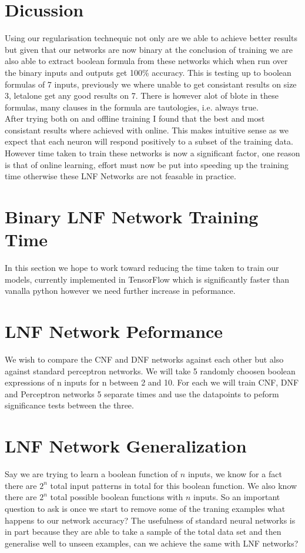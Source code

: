 \documentclass{article}
\theoremstyle{definition}
\begin{document}
\section{Dicussion}
Using our regularisation technequic not only are we able to achieve better results but given that our networks are now binary at the conclusion of training we are also able to extract boolean formula from these networks which when run over the binary inputs and outputs get 100\% accuracy. This is testing up to boolean formulas of 7 inputs, previously we where unable to get consistant results on size 3, letalone get any good results on 7. There is however alot of blote in these formulas, many clauses in the formula are tautologies, i.e. always true. \\

After trying both on and offline training I found that the best and most consistant results where achieved with online. This makes intuitive sense as we expect that each neuron will respond positively to a subset of the training data.\\

However time taken to train these networks is now a significant factor, one reason is that of online learning, effort must now be put into speeding up the training time otherwise these LNF Networks are not feasable in practice.

\section{Binary LNF Network Training Time}
In this section we hope to work toward reducing the time taken to train our models, currently implemented in TensorFlow which is significantly faster than vanalla python however we need further increase in peformance.

\section{LNF Network Peformance}
We wish to compare the CNF and DNF networks against each other but also against standard perceptron networks. We will take 5 randomly choosen boolean expressions of n inputs for n between 2 and 10. For each we will train CNF, DNF and Perceptron networks 5 separate times and use the datapoints to peform significance tests between the three.

\section{LNF Network Generalization}
Say we are trying to learn a boolean function of $n$ inputs, we know for a fact there are $2^n$ total input patterns in total for this boolean function. We also know there are $2^n$ total possible boolean functions with $n$ inputs. So an important question to ask is once we start to remove some of the traning examples what happens to our network accuracy? The usefulness of standard neural networks is in part because they are able to take a sample of the total data set and then generalise well to unseen examples, can we achieve the same with LNF networks?\\
\end{document}
